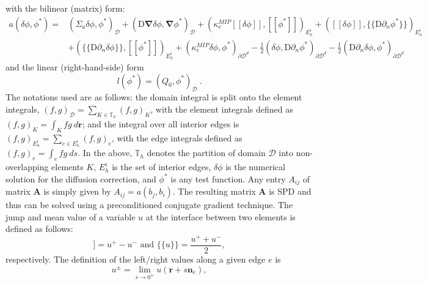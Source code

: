 \documentclass[preprint,10pt]{elsarticle}
\newcommand\bn{\boldsymbol{\nabla}}
\newcommand\br{\mathbf{r}}
\newcommand\bs{\boldsymbol}
\newcommand\mc{\mathcal}
\renewcommand{\(}{\left(}
\renewcommand{\)}{\right)}
\renewcommand{\[}{\left[}
\renewcommand{\]}{\right]}
\newcommand{\jmp}[1]{[\![#1]\!]}                     %
\newcommand{\mvl}[1]{\{\!\!\{#1\}\!\!\}}             %
\begin{document}
%
with the bilinear (matrix) form:
\begin{equation}
\begin{split}
a(\delta \phi,\phi^*) =& \(\Sigma_a \delta \phi,\phi^*\)_{\mc{D}}
  + (\mathrm{D}\bn\delta \phi,\bn\phi^*)_{\mc{D}} 
	+ \( \kappa_e^{MIP} \jmp{\delta \phi}, \jmp{\phi^*}      \)_{E_h^i} 
	+ \( \jmp{\delta \phi}, \mvl{\mathrm{D}\partial_n\phi^*} \)_{E_h^i} \\	
& + \( \mvl{\mathrm{D}\partial_n \delta \phi},\jmp{\phi^*} \)_{E_h^i} 
  + \(\kappa_e^{MIP} \delta \phi,\phi^*\)_{\partial \mc{D}^d} 
	- \frac{1}{2} \(\delta \phi,\mathrm{D} \partial_n\phi^*\)_{\partial \mc{D}^d} 
	- \frac{1}{2} \(\mathrm{D} \partial_n\delta \phi,\phi^*\)_{\partial \mc{D}^d}
\label{mip_b}
\end{split}
\end{equation}
%
and the linear (right-hand-side) form
%
\begin{equation}
l(\phi^*) = (Q_0,\phi^*)_{\mc{D}}\ . %
\label{mip_l}
\end{equation}
%
The notations used are as follows:
the domain integral is split onto the element integrals, $(f,g)_{\mc{D}} = \sum_{K\in \mathbb{T}_h} \(f,g\)_K$, with the element integrals defined as 
$(f,g)_K = \int_K fg\ d\br$; and 
the integral over all interior edges is $(f,g)_{E_h^i}=\sum_{e\in E_h^i}(f,g)_e$, with the edge integrals defined as 
$(f,g)_e = \int_e fg\ ds$. In the above, 
 $\mathbb{T}_h$ denotes the partition of domain
$\mc{D}$ into non-overlapping elements $K$, $E_h^i$ is the set of interior
edges, $\delta \phi$ is the numerical solution for the diffusion correction, and $\phi^*$ is any test function.
Any entry $A_{ij}$ of matrix $\bs{A}$ is simply given by $A_{ij}= a(b_j,b_i)$. The resulting matrix $\bs{A}$ is SPD
\cite{Arnold1982,arnold2000discontinuous} and thus can be solved using a preconditioned conjugate gradient technique.
%
%
The jump and mean value of a variable $u$  at the interface between two elements is defined as follows:
\begin{equation}
\jmp{u} = u^+ - u^- \text{ and } \mvl{u} = \frac{u^+ + u^-}{2} ,
\end{equation}
respectively.
%
The definition of the left/right values along a given edge $e$ is
\begin{equation}
u^{\pm}= \lim_{s\rightarrow 0^{\pm}}u(\bs{r}+s\bs{n}_e) ,
\end{equation}
\end{document}
